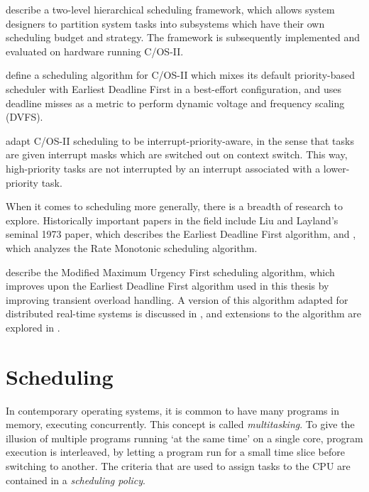 \documentclass[twoside]{uva-inf-bachelor-thesis}
\newcommand{\ucosii}{\textmu C/OS-II\xspace}
\begin{document}
\textcite{tue:hfs} describe a two-level hierarchical scheduling framework, which allows system designers to partition system tasks into subsystems which have their own scheduling budget and strategy. The framework is subsequently implemented and evaluated on hardware running \ucosii. 

\textcite{Cho2011} define a scheduling algorithm for \ucosii which mixes its default priority-based scheduler with Earliest Deadline First in a best-effort configuration, and uses deadline misses as a metric to perform dynamic voltage and frequency scaling (DVFS).

\textcite{dodiu2010} adapt \ucosii scheduling to be interrupt-priority-aware, in the sense that tasks are given interrupt masks which are switched out on context switch. This way, high-priority tasks are not interrupted by an interrupt associated with a lower-priority task.

When it comes to scheduling more generally, there is a breadth of research to explore.
Historically important papers in the field include Liu and Layland's seminal 1973 paper\cite{Liu1973}, which describes the Earliest Deadline First algorithm, and \textcite{Lehoczky1989}, which analyzes the Rate Monotonic scheduling algorithm.

\textcite{salmani2005modified} describe the Modified Maximum Urgency First scheduling algorithm, which improves upon the Earliest Deadline First algorithm used in this thesis by improving transient overload handling. A version of this algorithm adapted for distributed real-time systems is discussed in \textcite{chen2006flexible}, and extensions to the algorithm are explored in \textcite{behera2012enhanced}.

%
%
%
%

\chapter{Scheduling}
In contemporary operating systems, it is common to have many programs in memory, executing concurrently. This concept is called \textit{multitasking}. To give the illusion of multiple programs running `at the same time' on a single core, program execution is interleaved, by letting a program run for a small time slice before switching to another. The criteria that are used to assign tasks to the CPU are contained in a \textit{scheduling policy}. 
\end{document}
